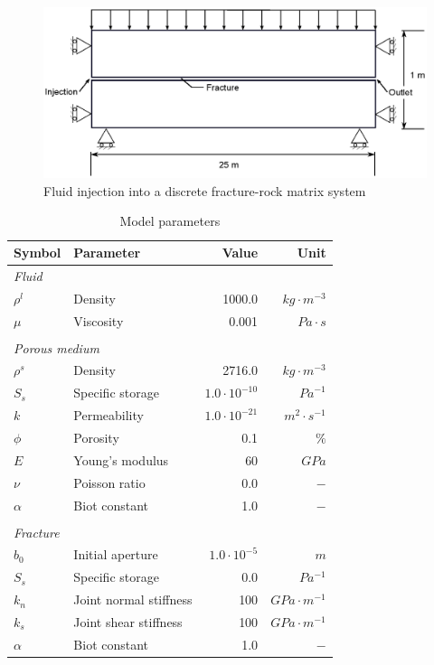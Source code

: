 \begin{figure}[htb]
\centering
\includegraphics[width=120mm]{PART_III/HM/figures/hm_Wijesinghe_problem}
\caption{Fluid injection into a discrete fracture-rock matrix system}
\label{fig:ex_hm_single_problem}
\end{figure}

\begin{table}[htb]
\centering
\caption{Model parameters}
\label{tbl:ex_hm_single_setting}
\begin{tabular}{llrr}
\toprule
Symbol & Parameter & Value & Unit \\
\midrule
\multicolumn{4}{l}{\textit{Fluid}}  \\ 
$\rho^l$ & Density & 1000.0 & $kg \cdot m^{-3}$ \\  
$\mu$ & Viscosity & 0.001 & $Pa \cdot s$ \\  \\ 
\multicolumn{4}{l}{\textit{Porous medium}}  \\  
$\rho^s$ & Density & 2716.0 & $kg \cdot m^{-3}$ \\ 
$S_s$ & Specific storage & $1.0\cdot 10^{-10}$ & ${Pa}^{-1}$ \\ 
$k$ & Permeability & $1.0\cdot 10^{-21}$ & $ m^2 \cdot s^{-1}$ \\ 
$\phi$ & Porosity & 0.1  & $ \%$ \\ 
$E$ & Young's modulus & 60 & $ GPa$ \\ 
$\nu$ & Poisson ratio & 0.0 & $-$ \\ 
$\alpha$ & Biot constant & 1.0 & $-$ \\  \\
\multicolumn{4}{l}{\textit{Fracture}}  \\  
$b_0$ & Initial aperture & $1.0\cdot 10^{-5}$ & $m$ \\ 
$S_s$ & Specific storage & 0.0 & $Pa^{-1}$ \\ 
$k_n$ & Joint normal stiffness & 100 & $GPa \cdot m^{-1}$ \\ 
$k_s$ & Joint shear stiffness & 100 & $GPa \cdot m^{-1}$ \\ 
$\alpha$ & Biot constant & 1.0 & $-$ \\ 
\bottomrule
\end{tabular}
\end{table}


